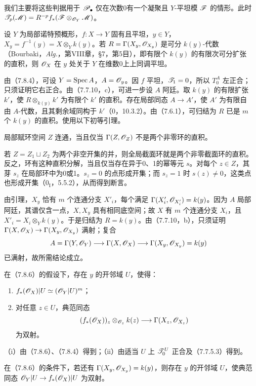 我们主要将这些判据用于 $\mathscr P_\bullet$ 仅在次数0有一个凝聚且 $Y$-平坦模 $\mathscr F$ 的情形。此时 $\mathscr T_p(\mathscr M)=R^{-p}f_*(\mathscr F\otimes_{\mathscr O_Y}\mathscr M)$。

设 $Y$ 为局部诺特预概形，$f:X\to Y$ 固有且平坦，$y\in Y$，$X_y=f^{-1}(y)=X\otimes_Y k(y)$。若 $R=\Gamma(X_y,\mathscr O_{X_y})$ 是可分 $k(y)$-代数（Bourbaki，\textit{Alg.}，第VIII章，§7，第5目），即有限个 $k(y)$ 的有限次可分扩张的直积，则 $\mathscr O_X$ 在 $y$ 处关于 $Y$ 在维数0上上同调平坦。

由（7.8.4），可设 $Y=\operatorname{Spec} A$，$A=\mathscr O_y$。因 $f$ 平坦，$\mathscr T_1=0$，所以 $T_0^A$ 左正合；只须证明它右正合。由（7.7.10，c），可进一步设 $A$ 阿廷。取 $k(y)$ 的有限扩张 $k'$，使 $R\otimes_{k(y)}k'$ 为有限个 $k'$ 的直积。存在局部同态 $A\to A'$，使 $A'$ 为有限自由 $A$-代数，且其剩余域同构于 $k'$（0，10.3.2）。由（7.6.1），可归结为 $R$ 已是 $m$ 个 $k(y)$ 的直积。使用以下初等引理。

局部赋环空间 $Z$ 连通，当且仅当 $\Gamma(Z,\mathscr O_Z)$ 不是两个非零环的直积。

若 $Z=Z_1\sqcup Z_2$ 为两个非空开集的并，则全局截面环就是两个非零截面环的直积。反之，环有这种直积分解，当且仅当存在异于0、1的幂等元 $s$。对每个 $z\in Z$，其芽 $s_z$ 在局部环中为0或1。$s_z=0$ 的点形成开集；而 $s_z=1$ 时 $s(z)\ne0$，这类点也形成开集（$0_{\mathrm I}$，5.5.2），从而得到断言。

由引理，$X_y$ 恰有 $m$ 个连通分支 $X'_i$，每个满足 $\Gamma(X'_i,\mathscr O_{X'_i})=k(y)$。因为 $A$ 局部阿廷，其谱仅含一点，$X,X_y$ 具有相同底空间；故 $X$ 有 $m$ 个连通分支 $X_i$，且 $X'_i=X_i\otimes_Yk(y)$。于是归结为 $R=k(y)$。由（7.7.10，b），只须证明 $\Gamma(X,\mathscr O_X)\to\Gamma(X_y,\mathscr O_{X_y})$ 满射；复合
\[
 A=\Gamma(Y,\mathscr O_Y)\longrightarrow\Gamma(X,\mathscr O_X)
 \longrightarrow\Gamma(X_y,\mathscr O_{X_y})=k(y)
\]
已满射，故所需结论成立。

在（7.8.6）的假设下，存在 $y$ 的开邻域 $U$，使得：
\begin{enumerate}[label=(\roman*)]
\item $f_*(\mathscr O_X)|U\simeq(\mathscr O_Y|U)^m$；
\item 对任意 $z\in U$，典范同态
\[
 (f_*(\mathscr O_X))_z\otimes_{\mathscr O_z}k(z)
 \longrightarrow\Gamma(X_z,\mathscr O_{X_z})
\]
为双射。
\end{enumerate}
（i）由（7.8.6）、（7.8.4）得到；（ii）由适当 $U$ 上 $\mathscr T_0^U$ 正合及（7.7.5.3）得到。

在（7.8.6）的条件下，若还有 $\Gamma(X_y,\mathscr O_{X_y})=k(y)$，则存在 $y$ 的开邻域 $U$，使典范同态 $\mathscr O_Y|U\to f_*(\mathscr O_X)|U$ 为双射。

